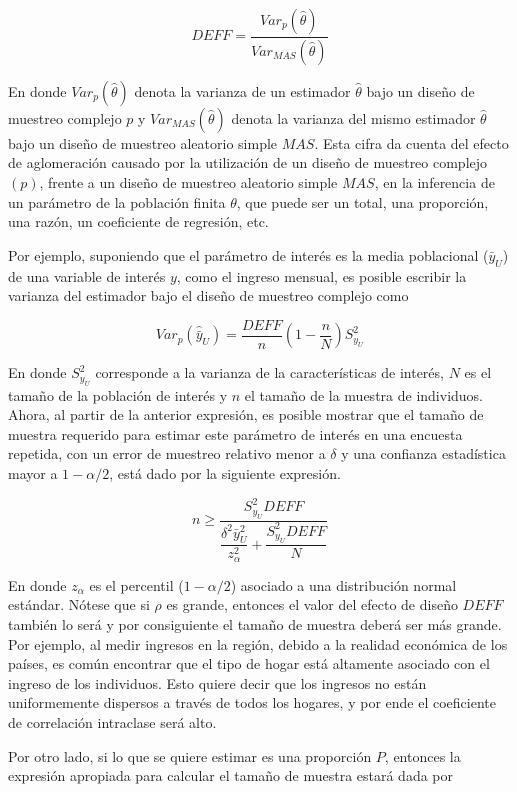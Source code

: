 \documentclass[
  12pt,
  spanish,
]{book}
\begin{document}
\[
DEFF=\frac{Var_p(\hat{\theta})}{Var_{MAS}(\hat{\theta})}
\]

En donde \(Var_p(\hat{\theta})\) denota la varianza de un estimador \(\hat{\theta}\) bajo un diseño de muestreo complejo \(p\) y \(Var_{MAS}(\hat{\theta})\) denota la varianza del mismo estimador \(\hat{\theta}\) bajo un diseño de muestreo aleatorio simple \(MAS\). Esta cifra da cuenta del efecto de aglomeración causado por la utilización de un diseño de muestreo complejo \((p)\), frente a un diseño de muestreo aleatorio simple \(MAS\), en la inferencia de un parámetro de la población finita \(\theta\), que puede ser un total, una proporción, una razón, un coeficiente de regresión, etc.

Por ejemplo, suponiendo que el parámetro de interés es la media poblacional (\(\bar{y}_U\)) de una variable de interés \(y\), como el ingreso mensual, es posible escribir la varianza del estimador bajo el diseño de muestreo complejo como

\[
Var_p(\hat{\bar{y}}_U) = \frac{DEFF}{n}\left(1-\frac{n}{N}\right)S^2_{y_U}
\]

En donde \(S^2_{y_U}\) corresponde a la varianza de la características de interés, \(N\) es el tamaño de la población de interés y \(n\) el tamaño de la muestra de individuos. Ahora, al partir de la anterior expresión, es posible mostrar que el tamaño de muestra requerido para estimar este parámetro de interés en una encuesta repetida, con un error de muestreo relativo menor a \(\delta\) y una confianza estadística mayor a \(1-\alpha/2\), está dado por la siguiente expresión.

\[ 
n \geq \dfrac{S^2_{y_U}DEFF}{\dfrac{\delta^2 \bar{y}_U^2}{z_{\alpha}^2}+\dfrac{S^2_{y_U}DEFF}{N}}
\]

En donde \(z_{\alpha}\) es el percentil (\(1- \alpha/2\)) asociado a una distribución normal estándar. Nótese que si \(\rho\) es grande, entonces el valor del efecto de diseño \(DEFF\) también lo será y por consiguiente el tamaño de muestra deberá ser más grande. Por ejemplo, al medir ingresos en la región, debido a la realidad económica de los países, es común encontrar que el tipo de hogar está altamente asociado con el ingreso de los individuos. Esto quiere decir que los ingresos no están uniformemente dispersos a través de todos los hogares, y por ende el coeficiente de correlación intraclase será alto.

Por otro lado, si lo que se quiere estimar es una proporción \(P\), entonces la expresión apropiada para calcular el tamaño de muestra estará dada por
\end{document}

